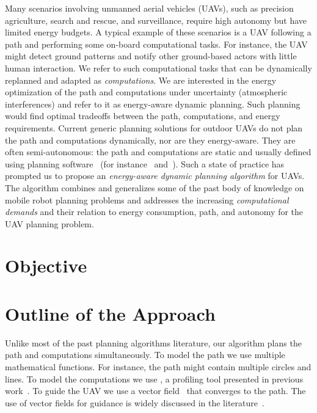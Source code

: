 Many scenarios involving unmanned aerial vehicles (UAVs), such as precision agriculture, search and rescue, and surveillance, require high autonomy but have limited energy budgets. A typical example of these scenarios is a UAV following a path and performing some on-board computational tasks. For instance, the UAV might detect ground patterns and notify other ground-based actors with little human interaction. We refer to such computational tasks that can be dynamically replanned and adapted as \emph{computations}. We are interested in the energy optimization of the path and computations under uncertainty (atmospheric interferences) and refer to it as energy-aware dynamic planning. Such planning would find optimal tradeoffs between the path, computations, and energy requirements. Current generic planning solutions for outdoor UAVs do not plan the path and computations dynamically, nor are they energy-aware. They are often semi-autonomous: the path and computations are static and usually defined using planning software~\citep{daponte2019review} (for instance~\citep{papa} and~\citep{px4}). Such a state of practice has prompted us to propose an \emph{energy-aware dynamic planning algorithm} for UAVs. The algorithm combines and generalizes some of the past body of knowledge on mobile robot planning problems and addresses the increasing \emph{computational demands} and their relation to energy consumption, path, and autonomy for the UAV planning problem.

\section{Objective}


\section{Outline of the Approach}

Unlike most of the past planning algorithms literature, our algorithm plans the path and computations simultaneously. To model the path we use multiple mathematical functions. For instance, the path might contain multiple circles and lines. To model the computations we use \powprof{}, a profiling tool presented in previous work~\citep{seewald2019coarse}. To guide the UAV we use a vector field~\citep{de2017guidance} that converges to the path. The use of vector fields for guidance is widely discussed in the literature~\citep{lindemann2005smoothly,gonccalves2010vector,panagou2014motion,zhou2014vector,kapitanyuk2017guiding,de2017guidance}. 


